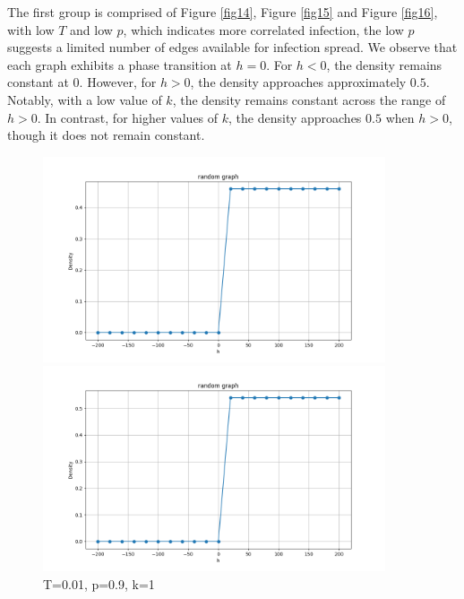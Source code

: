 \documentclass[11pt]{book}
\begin{document}
The first group is comprised of Figure \eqref{fig14}, Figure \eqref{fig15} and Figure \eqref{fig16}, with low $T$ and low $p$, which indicates more correlated infection, the low $p$ suggests a limited number of edges available for infection spread. We observe that each graph exhibits a phase transition at $h=0$. For $h < 0$, the density remains constant at $0$. However, for $h > 0$, the density approaches approximately $0.5$. Notably, with a low value of $k$, the density remains constant across the range of $h>0$. In contrast, for higher values of $k$, the density approaches $0.5$ when $h>0$, though it does not remain constant.


\begin{figure}
    \centering
    \begin{minipage}{0.45\textwidth}
        \centering
        \includegraphics[width=0.9\textwidth]{rg. T=0.01, p=0.9 k=1.png} %
        \caption{T=0.01, p=0.9, k=1}
        \label{fig17}
    \end{minipage}\hfill
    \begin{minipage}{0.45\textwidth}
        \centering
        \includegraphics[width=0.9\textwidth]{rg. T=0.01 p=0.9 k=3.png} %

\end{minipage}
\end{figure}
\end{document}
